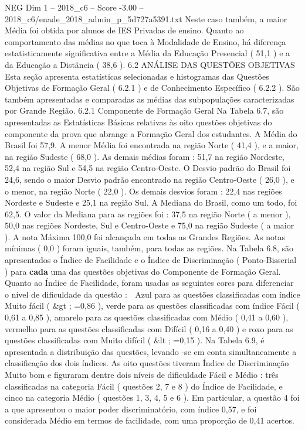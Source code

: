 \begin{textsample}{NEG Dim 1 – 2018\_c6 – Score -3.00 – 2018\_c6/enade\_2018\_admin\_p\_5d727a5391.txt}
Neste caso também, a maior Média foi obtida por alunos de IES Privadas de ensino.
Quanto ao comportamento das médias no que toca à Modalidade de Ensino, há diferença estatisticamente significativa entre a Média da Educação Presencial ( 51,1 ) e a da Educação a Distância ( 38,6 ). 6.2 ANÁLISE DAS QUESTÕES OBJETIVAS Esta seção apresenta estatísticas selecionadas e histogramas das Questões Objetivas de Formação Geral ( 6.2.1 ) e de Conhecimento Específico ( 6.2.2 ).
São também apresentadas e comparadas as médias das subpopulações caracterizadas por Grande Região. 6.2.1 Componente de Formação Geral Na Tabela 6.7, são apresentadas as Estatísticas Básicas relativas às oito questões objetivas do componente da prova que abrange a Formação Geral dos estudantes.
A Média do Brasil foi 57,9.
A menor Média foi encontrada na região Norte ( 41,4 ), e a maior, na região Sudeste ( 68,0 ).
As demais médias foram : 51,7 na região Nordeste, 52,4 na região Sul e 54,5 na região Centro-Oeste.
O Desvio padrão do Brasil foi 24,6, sendo o maior Desvio padrão encontrado na região Centro-Oeste ( 26,0 ), e o menor, na região Norte ( 22,0 ).
Os demais desvios foram : 22,4 nas regiões Nordeste e Sudeste e 25,1 na região Sul.
A Mediana do Brasil, como um todo, foi 62,5.
O valor da Mediana para as regiões foi : 37,5 na região Norte ( a menor ), 50,0 nas regiões Nordeste, Sul e Centro-Oeste e 75,0 na região Sudeste ( a maior ).
A nota Máxima 100,0 foi alcançada em todas as Grandes Regiões.
As notas mínimas ( 0,0 ) foram iguais, também, para todas as regiões.
Na Tabela 6.8, são apresentados o Índice de Facilidade e o Índice de Discriminação ( Ponto-Bisserial ) para \textbf{cada} uma das questões objetivas do Componente de Formação Geral.
Quanto ao Índice de Facilidade, foram usadas as seguintes cores para diferenciar o nível de dificuldade da questão :  Azul para as questões classificadas com índice Muito fácil ( \&gt ; =0,86 ), verde para as questões classificadas com índice Fácil ( 0,61 a 0,85 ), amarelo para as questões classificadas com Médio ( 0,41 a 0,60 ), vermelho para as questões classificadas com Difícil ( 0,16 a 0,40 ) e roxo para as questões classificadas com Muito difícil ( \&lt ; =0,15 ).
Na Tabela 6.9, é apresentada a distribuição das questões, levando -se em conta simultaneamente a classificação dos dois índices.
As oito questões tiveram Índice de Discriminação Muito bom e figuraram dentre dois níveis de dificuldade Fácil e Médio : três classificadas na categoria Fácil ( questões 2, 7 e 8 ) do Índice de Facilidade, e cinco na categoria Médio ( questões 1, 3, 4, 5 e 6 ).
Em particular, a questão 4 foi a que apresentou o maior poder discriminatório, com índice 0,57, e foi considerada Médio em termos de facilidade, com uma proporção de 0,41 acertos.

\end{textsample}
